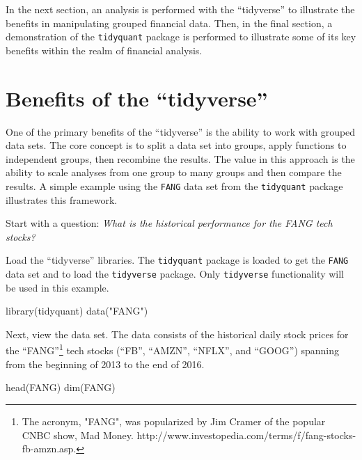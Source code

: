 In the next section, an analysis is performed with the ``tidyverse'' to
illustrate the benefits in manipulating grouped financial data. Then, in
the final section, a demonstration of the \texttt{tidyquant} package is
performed to illustrate some of its key benefits within the realm of
financial analysis.

\section{\texorpdfstring{Benefits of the
``tidyverse''}{Benefits of the tidyverse}}\label{benefits-of-the-tidyverse}

One of the primary benefits of the ``tidyverse'' is the ability to work
with grouped data sets. The core concept is to split a data set into
groups, apply functions to independent groups, then recombine the
results. The value in this approach is the ability to scale analyses
from one group to many groups and then compare the results. A simple
example using the \texttt{FANG} data set from the \texttt{tidyquant}
package illustrates this framework.

Start with a question: \emph{What is the historical performance for the
FANG tech stocks?}

Load the ``tidyverse'' libraries. The \texttt{tidyquant} package is
loaded to get the \texttt{FANG} data set and to load the
\texttt{tidyverse} package. Only \texttt{tidyverse} functionality will
be used in this example.

\begin{Schunk}
\begin{Sinput}
library(tidyquant) 
data("FANG")       
\end{Sinput}
\end{Schunk}

Next, view the data set. The data consists of the historical daily stock
prices for the
``FANG''\footnote{The acronym, "FANG", was popularized by Jim Cramer of the popular CNBC show, Mad Money. http://www.investopedia.com/terms/f/fang-stocks-fb-amzn.asp.}
tech stocks (``FB'', ``AMZN'', ``NFLX'', and ``GOOG'') spanning from the
beginning of 2013 to the end of 2016.

\begin{Schunk}
\begin{Sinput}
head(FANG)
dim(FANG)
\end{Sinput}
\end{Schunk}

